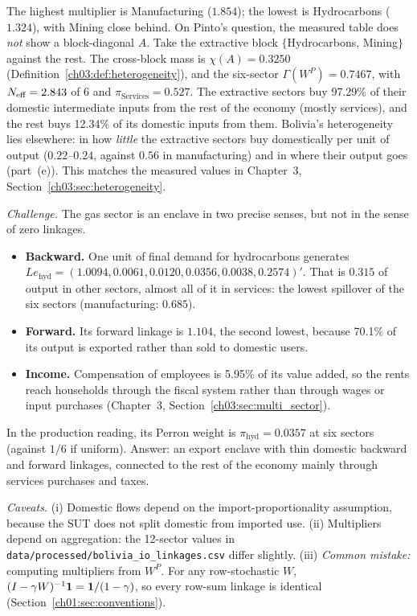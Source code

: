 \documentclass[../solutions_manual.tex]{subfiles}
\begin{document}
 The highest multiplier is Manufacturing ($1.854$); the lowest is Hydrocarbons ($1.324$), with Mining close behind. On Pinto's question, the measured table does \emph{not} show a block-diagonal $A$. Take the extractive block $\{$Hydrocarbons, Mining$\}$ against the rest. The cross-block mass is $\chi(A) = 0.3250$ (Definition~\ref{ch03:def:heterogeneity}), and the six-sector $\Gamma(W^P) = 0.7467$, with $N_{\text{eff}} = 2.843$ of 6 and $\pi_{\text{Services}} = 0.527$. The extractive sectors buy 97.29\% of their domestic intermediate inputs from the rest of the economy (mostly services), and the rest buys 12.34\% of its domestic inputs from them. Bolivia's heterogeneity lies elsewhere: in how \emph{little} the extractive sectors buy domestically per unit of output ($0.22$--$0.24$, against $0.56$ in manufacturing) and in where their output goes (part~(e)). This matches the measured values in Chapter~3, Section~\ref{ch03:sec:heterogeneity}.

 \textit{Challenge.} The gas sector is an enclave in two precise senses, but not in the sense of zero linkages.
\begin{itemize}
\item \textbf{Backward.} One unit of final demand for hydrocarbons generates $L e_{\text{hyd}} = (1.0094, 0.0061, 0.0120, 0.0356, 0.0038, 0.2574)'$. That is $0.315$ of output in other sectors, almost all of it in services: the lowest spillover of the six sectors (manufacturing: $0.685$).
\item \textbf{Forward.} Its forward linkage is $1.104$, the second lowest, because 70.1\% of its output is exported rather than sold to domestic users.
\item \textbf{Income.} Compensation of employees is 5.95\% of its value added, so the rents reach households through the fiscal system rather than through wages or input purchases (Chapter~3, Section~\ref{ch03:sec:multi_sector}).
\end{itemize}
In the production reading, its Perron weight is $\pi_{\text{hyd}} = 0.0357$ at six sectors (against $1/6$ if uniform). Answer: an export enclave with thin domestic backward and forward linkages, connected to the rest of the economy mainly through services purchases and taxes.

\emph{Caveats.} (i) Domestic flows depend on the import-proportionality assumption, because the SUT does not split domestic from imported use. (ii) Multipliers depend on aggregation: the 12-sector values in \texttt{data/processed/bolivia\_io\_linkages.csv} differ slightly. (iii) \emph{Common mistake:} computing multipliers from $W^P$. For any row-stochastic $W$, $(I - \gamma W)^{-1}\mathbf{1} = \mathbf{1}/(1-\gamma)$, so every row-sum linkage is identical (Section~\ref{ch01:sec:conventions}).
\end{document}
